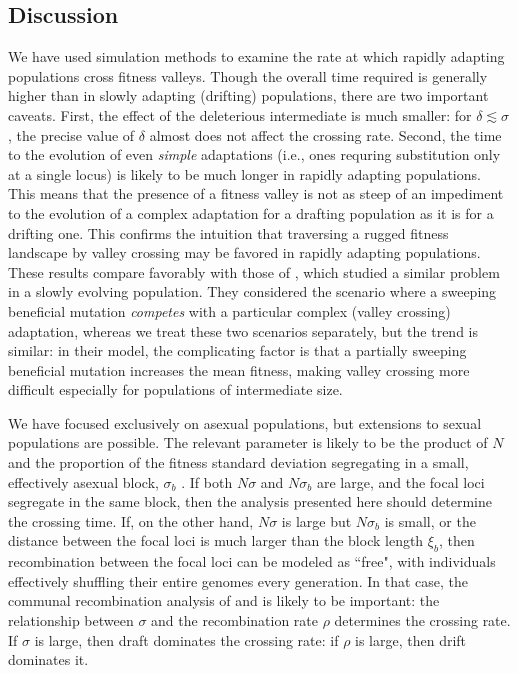 \documentclass[rmp]{revtex4}
\begin{document}
\begin{spacing}{1.5}
\section*{Discussion}

We have used simulation methods to examine the rate at which rapidly adapting populations cross fitness valleys.
Though the overall time required is generally higher than in slowly adapting (drifting) populations, there are two important caveats.
First, the effect of the deleterious intermediate is much smaller: for $\delta \lesssim \sigma$, the precise value of $\delta$ almost does not affect the crossing rate.
Second, the time to the evolution of even \emph{simple} adaptations (i.e., ones requring substitution only at a single locus) is likely to be much longer in rapidly adapting populations.
This means that the presence of a fitness valley is not as steep of an impediment to the evolution of a complex adaptation for a drafting population as it is for a drifting one.
This confirms the intuition that traversing a rugged fitness landscape by valley crossing may be favored in rapidly adapting populations.
These results compare favorably with those of \citet{ochs_2015}, which studied a similar problem in a slowly evolving population.
They considered the scenario where a sweeping beneficial mutation \emph{competes} with a particular complex (valley crossing) adaptation, whereas we treat these two scenarios separately, but the trend is similar: in their model, the complicating factor is that a partially sweeping beneficial mutation increases the mean fitness, making valley crossing more difficult especially for populations of intermediate size.

We have focused exclusively on asexual populations, but extensions to sexual populations are possible.
The relevant parameter is likely to be the product of $N$ and the proportion of the fitness standard deviation segregating in a small, effectively asexual block, $\sigma_b$ \citep{neher_kessinger_2013}.
If both $N\sigma$ and $N\sigma_b$ are large, and the focal loci segregate in the same block, then the analysis presented here should determine the crossing time.
If, on the other hand, $N\sigma$ is large but $N\sigma_b$ is small, or the distance between the focal loci is much larger than the block length $\xi_b$, then recombination between the focal loci can be modeled as ``free", with individuals effectively shuffling their entire genomes every generation.
In that case, the communal recombination analysis of \citet{neher_shraiman_2011} and \citet{neher_shraiman_2010} is likely to be important: the relationship between $\sigma$ and the recombination rate $\rho$ determines the crossing rate.
If $\sigma$ is large, then draft dominates the crossing rate: if $\rho$ is large, then drift dominates it.


\end{spacing}
\end{document}
